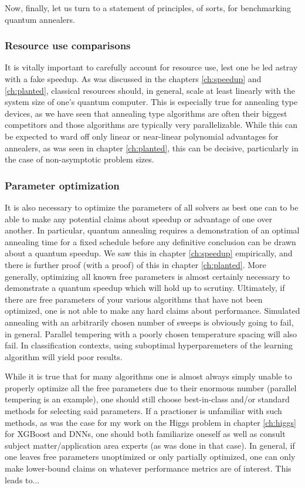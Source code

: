 Now, finally, let us turn to a statement of principles, of sorts, for benchmarking quantum annealers.

\subsubsection{Resource use comparisons}

	It is vitally important to carefully account for resource use, lest one be led astray with a fake speedup. As was discussed in the chapters \ref{ch:speedup} and \ref{ch:planted}, classical resources should, in general, scale at least linearly with the system size of one's quantum computer. This is especially true for annealing type devices, as we have seen that annealing type algorithms are often their biggest competitors and those algorithms are typically very parallelizable. While this can be expected to ward off only linear or near-linear polynomial advantages for annealers, as was seen in chapter \ref{ch:planted}, this can be decisive, particularly in the case of non-asymptotic problem sizes.

	\subsubsection{Parameter optimization}

	It is also necessary to optimize the parameters of all solvers as best one can to be able to make any potential claims about speedup or advantage of one over another. In particular, quantum annealing requires a demonstration of an optimal annealing time for a fixed schedule before any definitive conclusion can be drawn about a quantum speedup. We saw this in chapter \ref{ch:speedup} empirically, and there is further proof (with a proof) of this in chapter \ref{ch:planted}. More generally, optimizing all known free parameters is almost certainly necessary to demonstrate a quantum speedup which will hold up to scrutiny. Ultimately, if there are free parameters of your various algorithms that have not been optimized, one is not able to make any hard claims about performance. Simulated annealing with an arbitrarily chosen number of sweeps is obviously going to fail, in general. Parallel tempering with a poorly chosen temperature spacing will also fail. In classification contexts, using suboptimal hyperparemeters of the learning algorithm will yield poor results.

	While it is true that for many algorithms one is almost always simply unable to properly optimize all the free parameters due to their enormous number (parallel tempering is an example), one should still choose best-in-class and/or standard methods for selecting said parameters. If a practioner is unfamiliar with such methods, as was the case for my work on the Higgs problem in chapter \ref{ch:higgs} for XGBoost and DNNs, one should both familiarize oneself as well as consult subject matter/application area experts (as was done in that case). In general, if one leaves free parameters unoptimized or only partially optimized, one can only make lower-bound claims on whatever performance metrics are of interest. This leads to...

